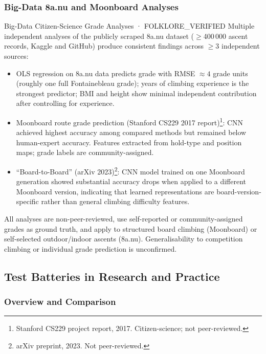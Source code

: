 \subsubsection{Big-Data 8a.nu and Moonboard Analyses}

\begin{folklorebox}{Big-Data Citizen-Science Grade Analyses · FOLKLORE\_VERIFIED}
Multiple independent analyses of the publicly scraped 8a.nu dataset ($\geq$400\,000 ascent records, Kaggle and GitHub) produce consistent findings across $\geq$3 independent sources:
\begin{itemize}
  \item OLS regression on 8a.nu data predicts grade with RMSE $\approx 4$ grade units (roughly one full Fontainebleau grade); years of climbing experience is the strongest predictor; BMI and height show minimal independent contribution after controlling for experience.
  \item Moonboard route grade prediction (Stanford CS229 2017 report)\footnote{Stanford CS229 project report, 2017. Citizen-science; not peer-reviewed.}: CNN achieved highest accuracy among compared methods but remained below human-expert accuracy. Features extracted from hold-type and position maps; grade labels are community-assigned.
  \item ``Board-to-Board'' (arXiv 2023)\footnote{arXiv preprint, 2023. Not peer-reviewed.}: CNN model trained on one Moonboard generation showed substantial accuracy drops when applied to a different Moonboard version, indicating that learned representations are board-version-specific rather than general climbing difficulty features.
\end{itemize}
All analyses are non-peer-reviewed, use self-reported or community-assigned grades as ground truth, and apply to structured board climbing (Moonboard) or self-selected outdoor/indoor ascents (8a.nu). Generalisability to competition climbing or individual grade prediction is unconfirmed.
\end{folklorebox}

\subsection{Test Batteries in Research and Practice}
\label{sec:testbatteries}

\subsubsection{Overview and Comparison}

